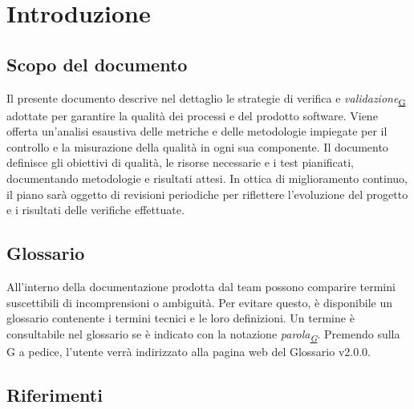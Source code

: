 \documentclass[a4paper,12pt]{article}
\begin{document}
\newpage

\tableofcontents

\newpage

\listoffigures

\newpage

\listoftables

\newpage
\section{Introduzione}{
    \subsection{Scopo del documento}{
        Il presente documento descrive nel dettaglio le strategie di verifica e \textit{validazione}\textsubscript{\href{https://atlasteam9.github.io/Atlas/glossario.html\#Validazione}{G}} adottate per garantire la qualità dei processi e del prodotto software. Viene offerta un'analisi esaustiva delle metriche e delle metodologie impiegate per il controllo e la misurazione della qualità in ogni sua componente. Il documento definisce gli obiettivi di qualità, le risorse necessarie e i test pianificati, documentando metodologie e risultati attesi. \newline
        In ottica di miglioramento continuo, il piano sarà oggetto di revisioni periodiche per riflettere l'evoluzione del progetto e i risultati delle verifiche effettuate.
    }

    \subsection{Glossario}{
        All'interno della documentazione prodotta dal team possono comparire termini suscettibili di incomprensioni o ambiguità. Per evitare questo, è disponibile un glossario contenente i termini tecnici e le loro definizioni. Un termine è consultabile nel glossario se è indicato con la notazione \textit{parola\textsubscript{\href{https://atlasteam9.github.io/Atlas/glossario.html}{G}}}.
        Premendo sulla G a pedice, l'utente verrà indirizzato alla pagina web del Glossario v2.0.0.
    }

    \subsection{Riferimenti}{
}}
\end{document}
